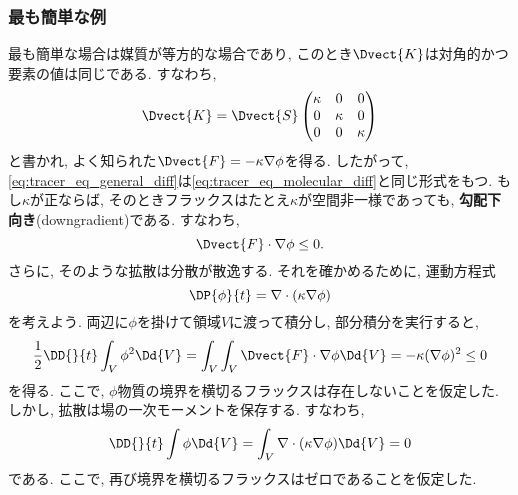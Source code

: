 \subsubsection*{最も簡単な例}
最も簡単な場合は媒質が等方的な場合であり, このとき$\Dvect{K}$は対角的かつ要素の値は同じである. 
すなわち, 
\begin{equation}
  \Dvect{K} = \Dvect{S}
\begin{pmatrix}
 \kappa &0 &0 \\
 0 &\kappa &0 \\
 0 &0 &\kappa
\end{pmatrix}
\end{equation}
と書かれ, よく知られた$\Dvect{F}=-\kappa\nabla \phi$を得る. 
したがって, \eqref{eq:tracer_eq_general_diff}は\eqref{eq:tracer_eq_molecular_diff}と同じ形式をもつ. 
もし$\kappa$が正ならば, そのときフラックスはたとえ$\kappa$が空間非一様であっても, 
\textbf{勾配下向き}(downgradient)である. すなわち, 
\begin{equation}
  \Dvect{F} \cdot \nabla \phi \le 0. 
\end{equation}
さらに, そのような拡散は分散が散逸する. 
それを確かめるために, 運動方程式
\begin{equation}
 \DP{\phi}{t} = \nabla \cdot (\kappa \nabla \phi)
\end{equation}
を考えよう. 
両辺に$\phi$を掛けて領域$V$に渡って積分し, 部分積分を実行すると, 
\begin{equation}
   \dfrac{1}{2} \DD{}{t} \int_V \phi^2 \Dd{V}
 = \int_V \int_{V} \Dvect{F} \cdot \nabla \phi \Dd{V}
 = - \kappa (\nabla \phi)^2 \le 0
\end{equation}
を得る. 
ここで, $\phi$物質の境界を横切るフラックスは存在しないことを仮定した. 
しかし, 拡散は場の一次モーメントを保存する. 
すなわち, 
\begin{equation}
  \DD{}{t} \int \phi \Dd{V} = \int_V \nabla \cdot (\kappa \nabla \phi) \Dd{V} = 0 
\end{equation}
である. 
ここで, 再び境界を横切るフラックスはゼロであることを仮定した. 


